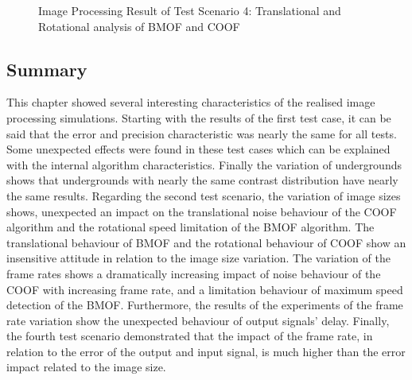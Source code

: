 \begin{figure}[H]
\hfill
{}
\caption{Image Processing Result of Test Scenario 4: Translational and Rotational analysis of BMOF and COOF} 
\label{fig:Eval_IP_TS4_1.png}
\end{figure}


\subsection{Summary}
\label{mt:c:expResults:AnalysisofImageProcessing:Summary}
This chapter showed several interesting characteristics of the realised image processing simulations. Starting with the results of the first test case, it can be said that the error and precision characteristic was nearly the same for all tests. Some unexpected effects were found in these test cases which can be explained with the internal algorithm characteristics. Finally the variation of undergrounds shows that undergrounds with nearly the same contrast distribution have nearly the same results. Regarding the second test scenario, the variation of image sizes shows, unexpected an impact on the translational noise behaviour of the \gls{COOF} algorithm and the rotational speed limitation of the \gls{BMOF} algorithm. The translational behaviour of \gls{BMOF} and the rotational behaviour of \gls{COOF} show an insensitive attitude in relation to the image size variation. The variation of the frame rates shows a dramatically increasing impact of noise behaviour of the \gls{COOF} with increasing frame rate, and a limitation behaviour of maximum speed detection of the \gls{BMOF}. Furthermore, the results of the experiments of the frame rate variation show the unexpected behaviour of output signals' delay. Finally, the fourth test scenario demonstrated that the impact of the frame rate, in relation to the error of the output and input signal, is much higher than the error impact related to the image size.  

